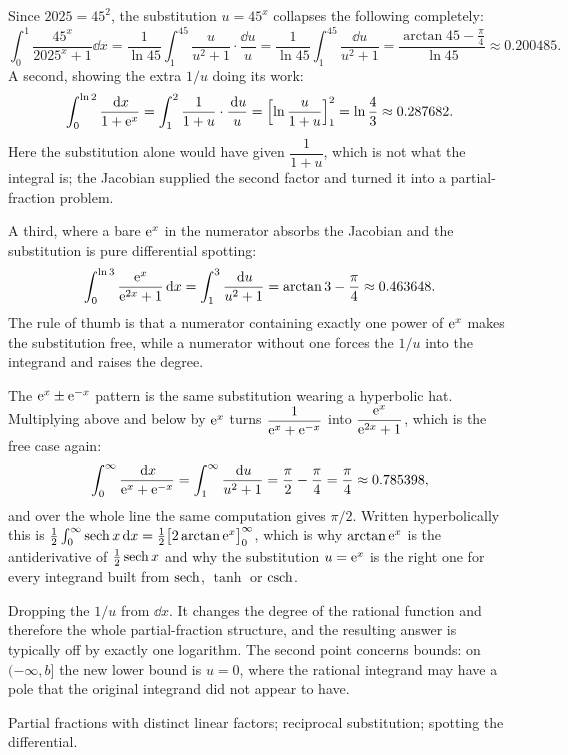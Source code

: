 \begin{worked}
Since $2025=45^2$, the substitution $u=45^x$ collapses the following completely:
\[
\int_0^1\frac{45^x}{2025^x+1}\dd x=\frac{1}{\ln45}\int_1^{45}\frac{u}{u^2+1}\cdot\frac{\dd u}{u}
=\frac{1}{\ln45}\int_1^{45}\frac{\dd u}{u^2+1}=\frac{\arctan45-\tfrac{\pi}{4}}{\ln45}\approx0.200485 .
\]
A second, showing the extra $1/u$ doing its work:
\[
\int_0^{\ln2}\frac{\,\mathrm{d} x}{1+\mathrm{e}^x}=\int_1^{2}\frac{1}{1+u}\cdot\frac{\,\mathrm{d} u}{u}=\Bigl[\ln\frac{u}{1+u}\Bigr]_1^2=\ln\frac43\approx0.287682 .
\]
Here the substitution alone would have given $\dfrac{1}{1+u}$, which is not what the integral is; the Jacobian supplied the second factor and turned it into a partial-fraction problem.

A third, where a bare $\mathrm{e}^x$ in the numerator absorbs the Jacobian and the substitution is pure differential spotting:
\[
\int_0^{\ln3}\frac{\mathrm{e}^x}{\mathrm{e}^{2x}+1}\,\mathrm{d} x=\int_1^{3}\frac{\,\mathrm{d} u}{u^2+1}=\arctan3-\frac{\pi}{4}\approx0.463648 .
\]
The rule of thumb is that a numerator containing exactly one power of $\mathrm{e}^x$ makes the substitution free, while a numerator without one forces the $1/u$ into the integrand and raises the degree.

The $\mathrm{e}^x\pm\mathrm{e}^{-x}$ pattern is the same substitution wearing a hyperbolic hat. Multiplying above and below by $\mathrm{e}^x$ turns $\dfrac{1}{\mathrm{e}^x+\mathrm{e}^{-x}}$ into $\dfrac{\mathrm{e}^x}{\mathrm{e}^{2x}+1}$, which is the free case again:
\[
\int_0^{\infty}\frac{\,\mathrm{d} x}{\mathrm{e}^x+\mathrm{e}^{-x}}=\int_1^{\infty}\frac{\,\mathrm{d} u}{u^2+1}=\frac{\pi}{2}-\frac{\pi}{4}=\frac{\pi}{4}\approx0.785398 ,
\]
and over the whole line the same computation gives $\pi/2$. Written hyperbolically this is $\tfrac12\int_0^\infty\operatorname{sech} x\,\mathrm{d} x=\tfrac12\bigl[2\arctan\mathrm{e}^x\bigr]_0^{\infty}$, which is why $\arctan\mathrm{e}^x$ is the antiderivative of $\tfrac12\operatorname{sech} x$ and why the substitution $u=\mathrm{e}^x$ is the right one for every integrand built from $\operatorname{sech}$, $\tanh$ or $\operatorname{csch}$.
\end{worked}

\begin{trap}
Dropping the $1/u$ from $\dd x$. It changes the degree of the rational function and therefore the whole partial-fraction structure, and the resulting answer is typically off by exactly one logarithm. The second point concerns bounds: on $(-\infty,b]$ the new lower bound is $u=0$, where the rational integrand may have a pole that the original integrand did not appear to have.
\end{trap}

\begin{seealsob}Partial fractions with distinct linear factors; reciprocal substitution; spotting the differential.\end{seealsob}


